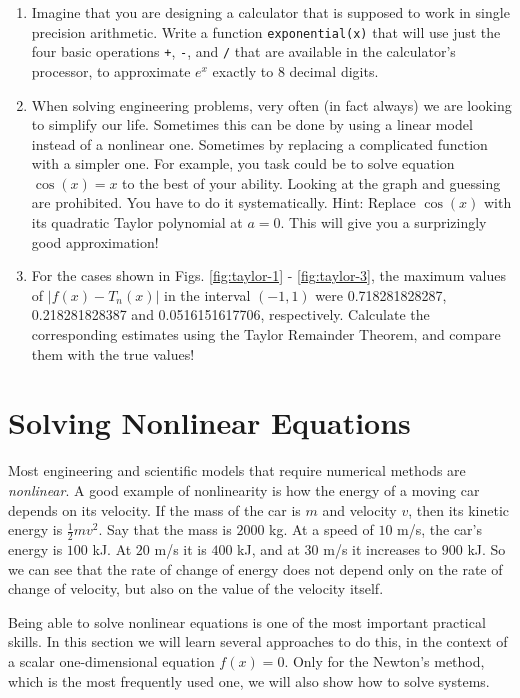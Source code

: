 \documentclass{article}
\begin{document}
\begin{enumerate}
\item Imagine that you are designing a calculator that is supposed to work in 
single precision arithmetic. Write a function {\tt exponential(x)} that will
use just the four basic operations {\tt +}, {\tt -}, {\tt *} and {\tt /} that 
are available in the calculator's processor, to approximate $e^x$ exactly to 8
decimal digits.
\item When solving engineering problems, very often (in fact always) we are 
looking to simplify our life. Sometimes this can be done by using a linear model instead of 
a nonlinear one. Sometimes by replacing a complicated function 
with a simpler one. For example, you task could be to solve equation $\cos(x) = x$
to the best of your ability. Looking at the graph and guessing are prohibited. 
You have to do it systematically. Hint: Replace $\cos(x)$ with its quadratic Taylor 
polynomial at $a = 0$. This will give you a surprizingly good approximation!
\item For the cases shown in Figs. \ref{fig:taylor-1} - \ref{fig:taylor-3}, the 
maximum values of $|f(x) - T_n(x)|$ in the interval 
$(-1, 1)$ were 0.718281828287, 0.218281828387 and 0.0516151617706, respectively.
Calculate the corresponding estimates using the Taylor Remainder Theorem, and compare
them with the true values! 
\end{enumerate}

\section{Solving Nonlinear Equations}

Most engineering and scientific models that require numerical methods are {\em nonlinear}.
A good example of nonlinearity is how the energy of a moving car depends on its velocity.
If the mass of the car is $m$ and velocity $v$, then its kinetic energy is $\frac{1}{2}mv^2$.
Say that the mass is $2000$ kg. At a speed of $10$ m/s, the car's energy is $100$ kJ. At 
$20$ m/s it is $400$ kJ, and at $30$ m/s it increases to $900$ kJ. So we can see that 
the rate of change of energy does not depend only on the rate of change of velocity,
but also on the value of the velocity itself. 
 
Being able to solve nonlinear equations is one of the most important 
practical skills. In this section we will learn several approaches to do this,
in the context of a scalar one-dimensional equation $f(x) = 0$. Only for the 
Newton's method, which is the most frequently used one, we will also 
show how to solve systems. 
\end{document}
